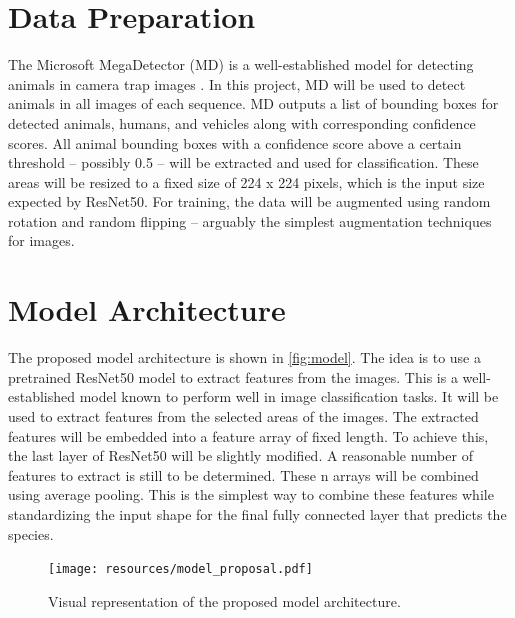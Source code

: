 \documentclass{article}
\begin{document}
\section*{Data Preparation} %

The Microsoft MegaDetector (MD) is a well-established model for detecting animals in camera trap images 
\autocite{hernandezPytorchWildlifeCollaborativeDeep2024a, velezChoosingAppropriatePlatform2022,
schneiderRecognitionEuropeanMammals2024}. In this project, MD will be used to detect animals in all images
of each sequence. MD outputs a list of bounding boxes for detected animals, humans, and vehicles
along with corresponding confidence scores. All animal bounding boxes with a confidence score above a certain threshold 
-- possibly 0.5 -- will be extracted and used for classification. These areas will be resized to a fixed
size of 224 x 224 pixels, which is the input size expected by ResNet50. For training, the data will be augmented
using random rotation and random flipping -- arguably the simplest augmentation techniques for images.

\section*{Model Architecture} %

The proposed model architecture is shown in \autoref{fig:model}. The idea is to use a pretrained ResNet50 model to
extract features from the images. This is a well-established model known to perform well in image classification
tasks. It will be used to extract features from the selected areas of the images. The extracted features will be embedded
into a feature array of fixed length. To achieve this, the last layer of ResNet50 will be slightly modified.
A reasonable number of features to extract is still to be determined. These n arrays will be combined using
average pooling. This is the simplest way to combine these features while standardizing the input shape
for the final fully connected layer that predicts the species.

\begin{figure}[ht]
  \centering
  \texttt{[image: resources/model\_proposal.pdf]}
  \caption{Visual representation of the proposed model architecture.}
  \label{fig:model}
\end{figure}
\end{document}
